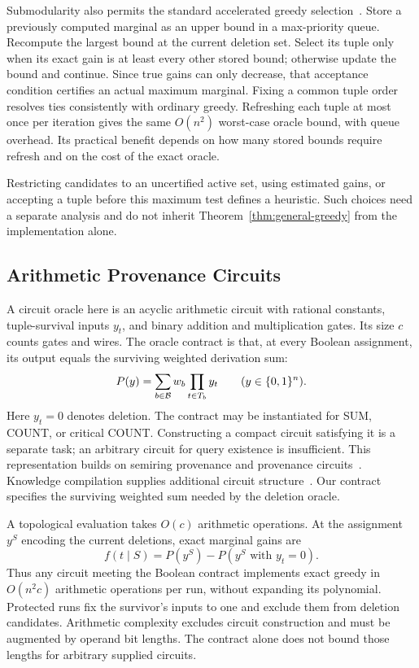 Submodularity also permits the standard accelerated greedy
selection~\cite{minoux1978lazy}. Store a previously
computed marginal as an upper bound in a max-priority queue. Recompute
the largest bound at the current deletion set. Select its tuple only when
its exact gain is at least every other stored bound; otherwise update the
bound and continue. Since true gains can only decrease, that acceptance
condition certifies an actual maximum marginal. Fixing a common tuple
order resolves ties consistently with ordinary greedy. Refreshing each
tuple at most once per iteration gives the same $O(n^2)$ worst-case oracle
bound, with queue overhead. Its practical benefit depends on how many
stored bounds require refresh and on the cost of the exact oracle.

Restricting candidates to an uncertified active set, using estimated gains,
or accepting a tuple before this maximum test defines a heuristic. Such
choices need a separate analysis and do not inherit
Theorem~\ref{thm:general-greedy} from the implementation alone.

\subsection{Arithmetic Provenance Circuits}
\label{sec:circuits}

A circuit oracle here is an acyclic arithmetic circuit with rational
constants, tuple-survival inputs $y_t$, and binary addition and
multiplication gates. Its size $c$ counts gates and wires. The oracle
contract is that, at every Boolean assignment, its output equals the
surviving weighted derivation sum:
\begin{equation}
\label{eq:circuit-contract}
P(y)=\sum_{b\in\mathcal{B}}w_b\prod_{t\in T_b}y_t
\qquad(y\in\{0,1\}^{n}).
\end{equation}
Here $y_t=0$ denotes deletion. The contract may be instantiated for SUM,
COUNT, or critical COUNT. Constructing a compact circuit satisfying it
is a separate task; an arbitrary circuit for query existence is
insufficient. This representation builds on semiring provenance and provenance
circuits~\cite{green2007provenance,deutch2014circuits}. Knowledge compilation supplies additional circuit
structure~\cite{amarilli2015circuits,amarilli2024tractable}. Our contract
specifies the surviving weighted sum needed by the deletion oracle.

A topological evaluation takes $O(c)$ arithmetic operations. At the
assignment $y^S$ encoding the current deletions, exact marginal gains are
\begin{equation}
\label{eq:circuit-difference}
f(t\mid S)=P(y^S)-P(y^S\text{ with }y_t=0).
\end{equation}
Thus any circuit meeting the Boolean contract implements exact greedy
in $O(n^2c)$ arithmetic operations per run, without expanding its
polynomial. Protected runs fix the survivor's inputs to one and exclude
them from deletion candidates. Arithmetic complexity excludes circuit
construction and must be augmented by operand bit lengths. The contract
alone does not bound those lengths for arbitrary supplied circuits.

